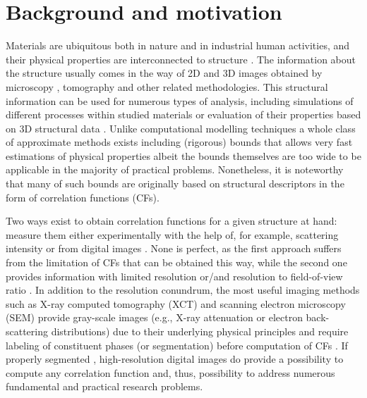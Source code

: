 \documentclass[1p]{elsarticle}
\begin{document}
\section{Background and motivation}
\label{sec:background}
Materials are ubiquitous both in nature and in industrial human activities, and
their physical properties are interconnected to structure
\cite{Torquato_book,Sahimi_book}. The information about the structure usually
comes in the way of 2D and 3D images obtained by microscopy
\cite{moussaoui2018,neumann2019,FIB-SEMpaper}, tomography \cite{xctmat_book} and
other related methodologies.  This structural information can be used for
numerous types of analysis, including simulations of different processes within
studied materials or evaluation of their properties based on 3D structural data
\cite{youssef2005,Miao2017,FDMSS}. Unlike computational modelling techniques a
whole class of approximate methods exists including (rigorous) bounds that
allows very fast estimations of physical properties
\cite{eshelby1957,berryman1986use,rozanski2023} albeit the bounds themselves are
too wide to be applicable in the majority of practical problems. Nonetheless, it
is noteworthy that many of such bounds are originally based on structural
descriptors in the form of correlation functions (CFs).

Two ways exist to obtain correlation functions for a given structure at hand:
measure them either experimentally with the help of, for example, scattering
intensity \cite{debye1957scattering,li2018direct} or from digital images
\cite{berryman1985measurement,ma2018SS}. None is perfect, as the first approach
suffers from the limitation of CFs that can be obtained this way, while the
second one provides information with limited resolution or/and resolution to
field-of-view ratio \cite{gerke2015universal}. In addition to the resolution
conundrum, the most useful imaging methods such as X-ray computed tomography
(XCT) and scanning electron microscopy (SEM) provide gray-scale images (e.g.,
X-ray attenuation or electron back-scattering distributions) due to their
underlying physical principles and require labeling of constituent phases (or
segmentation) before computation of CFs \cite{samarin2023robust}. If properly
segmented \cite{NNseg}, high-resolution digital images do provide a possibility
to compute any correlation function and, thus, possibility to address numerous
fundamental and practical research problems.
\end{document}
